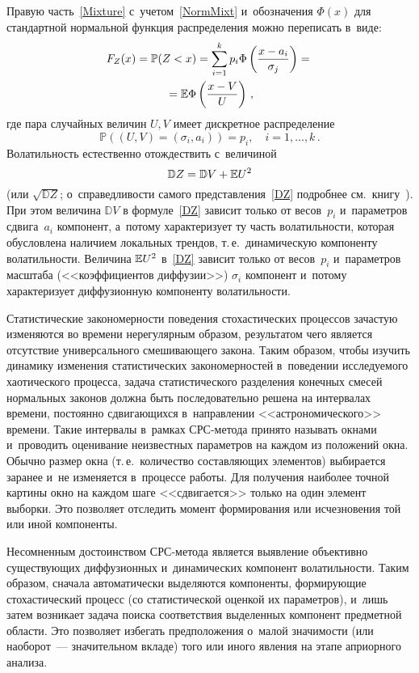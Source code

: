 \begin{multicols}{2}
Правую часть~\eqref{Mixture} с~учетом~\eqref{NormMixt} и~обозначения $\Phi(x)$ для стандартной
нормальной функция распределения можно переписать в~виде:
\begin{multline*}
F_Z(x)={\mathbb P}(Z<x)=\sum_{i=1}^k
p_i\Phi\left(\displaystyle\frac{\displaystyle x-a_i\mathstrut}{\displaystyle \sigma_j\mathstrut}\right)={}\\
{}=\mathbb E\Phi\left(\displaystyle\frac{\displaystyle x-V\mathstrut}{\displaystyle U\mathstrut}\right)\,,
\end{multline*}
где пара случайных величин $U,V$ имеет дискретное
распределение
\begin{equation*}
{\mathbb P}((U,V)=(\sigma_i,a_i))=p_i,\quad i=1,\ldots,k\,.
\end{equation*}
Волатильность естественно отождествить с~величиной
\begin{equation}
{\mathbb D} Z={\mathbb D} V+\mathbb E U^2 \label{DZ}
\end{equation}
(или $\sqrt{{\mathbb D} Z}$; о~справедливости самого пред\-став\-ления~\eqref{DZ}
подробнее см.\ книгу~\cite{Korolev2011}). При этом величина ${\mathbb D} V$ 
в формуле~\eqref{DZ} зависит
только от весов~$p_i$ и~параметров сдвига~$a_i$
компонент, а~потому характеризует ту часть волатильности, которая
обуслов\-ле\-на наличием локальных трендов, т.\,е.\ {динамическую}
компоненту волатильности. Величина $\mathbb E U^2$ в~\eqref{DZ} зависит только от весов~$p_i$ и~параметров
масштаба (<<коэффициентов диффузии>>) $\sigma_i$ компонент и~потому характеризует
{диффузионную}
компоненту волатильности.

Статистические закономерности поведения стохастических процессов зачастую изменяются во времени
нерегулярным образом, результатом чего является отсутствие универсального смешивающего
закона. Таким образом, чтобы изучить динамику изменения статистических закономерностей в~поведении
исследуемого хаотического процесса, задача статистического разделения конечных
смесей нормальных законов должна быть последовательно решена на интервалах времени, постоянно
сдвигающихся в~направлении <<астрономического>> времени. Такие интервалы в~рамках СРС-метода принято
называть {окнами} и~проводить оценивание неизвестных параметров на каждом из положений окна.
Обычно размер окна (т.\,е.\ количество со\-став\-ля\-ющих элементов) выбирается заранее и~не изменяется в~процессе работы. Для получения наиболее точной картины окно на каждом шаге <<сдвигается>> только на
один элемент выборки. Это позволяет отследить момент формирования или исчезновения той или иной
компоненты.

Несомненным достоинством СРС-ме\-то\-да является выявление объективно
существующих диффузионных и~динамических компонент во\-ла\-тиль\-ности.
Таким образом, сначала автоматически выделяют\-ся
компоненты, формирующие стохастический процесс (со статистической оценкой их параметров), и~лишь
затем возникает задача поиска соответствия выделенных компонент предметной области. Это позволяет
избегать предположения о~малой значимости (или наоборот~--- значительном вкладе) того или иного
явления на этапе априорного анализа.


\end{multicols}
